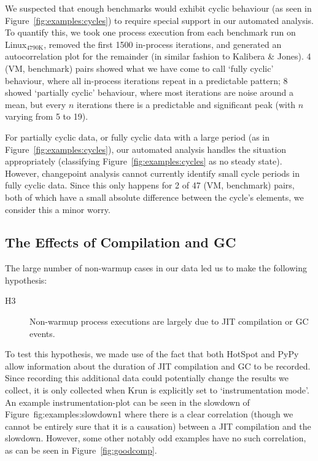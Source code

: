 \documentclass[preprint,numbers,10pt]{sigplanconf}
\newcommand{\kalibera}{Kalibera \& Jones\xspace}
\newcommand{\krun}{Krun\xspace}
\newcommand{\bencherthree}{Linux$_\mathrm{4790K}$\xspace}
\begin{document}
We suspected that enough benchmarks
would exhibit cyclic behaviour (as seen in Figure~\ref{fig:examples:cycles}) to
require special support in our automated analysis. To quantify this, we took one process
execution from each benchmark run on \bencherthree, removed the first 1500
in-process iterations, and generated an autocorrelation plot for the remainder
(in similar fashion to \kalibera). 4 (VM, benchmark) pairs showed what we have come to
call `fully cyclic' behaviour, where all in-process iterations repeat in a
predictable pattern; 8 showed `partially cyclic' behaviour, where
most iterations are noise around a mean, but every $n$ iterations there is a
predictable and significant peak (with $n$ varying from 5 to 19).

For partially cyclic data, or fully cyclic data with a large period (as in
Figure~\ref{fig:examples:cycles}), our automated analysis handles the situation
appropriately (classifying Figure~\ref{fig:examples:cycles} as no steady state).
However, changepoint analysis cannot currently identify small cycle periods in
fully cyclic data. Since this only happens for 2
of 47 (VM, benchmark) pairs, both of which have a small absolute difference between the
cycle's elements, we consider this a minor worry.


\subsection{The Effects of Compilation and GC}
\label{sec:deepdive}

The large number of non-warmup cases in our data led us to make the following hypothesis:
\begin{description}
  \item[H3] Non-warmup process executions are largely due to JIT compilation or GC events.
\end{description}
To test this hypothesis, we made use of the fact that both HotSpot and PyPy allow
information about the duration of JIT compilation and GC to be recorded. Since
recording this additional data could potentially change the results we collect,
it is only collected when \krun is explicitly set to `instrumentation mode'. An
example instrumentation-plot can be seen in the slowdown of
Figure~{fig:examples:slowdown1} where there is a clear correlation (though we
cannot be entirely sure that it is a causation) between a JIT compilation and
the slowdown. However, some other notably odd examples have no such correlation,
as can be seen in Figure~\ref{fig:goodcomp}.
\end{document}
